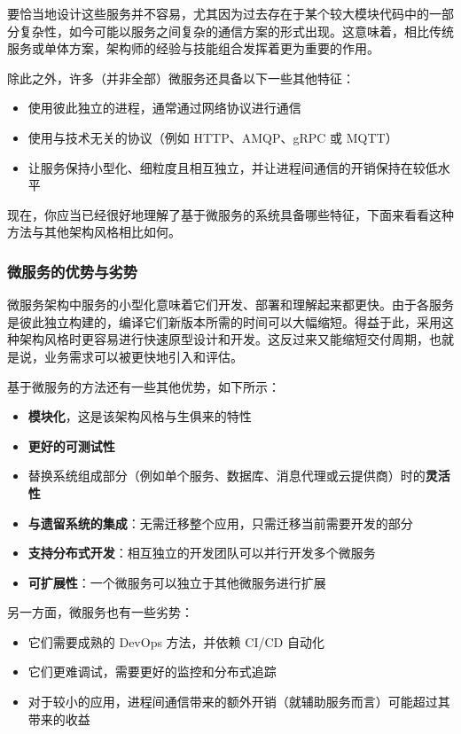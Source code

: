 要恰当地设计这些服务并不容易，尤其因为过去存在于某个较大模块代码中的一部分复杂性，如今可能以服务之间复杂的通信方案的形式出现。这意味着，相比传统服务或单体方案，架构师的经验与技能组合发挥着更为重要的作用。

\label{idx:104}
除此之外，许多（并非全部）微服务还具备以下一些其他特征：

\begin{itemize}
\item 使用彼此独立的进程，通常通过网络协议进行通信
\item 使用与技术无关的协议（例如 HTTP、AMQP、gRPC 或 MQTT）
\item 让服务保持小型化、细粒度且相互独立，并让进程间通信的开销保持在较低水平
\end{itemize}

现在，你应当已经很好地理解了基于微服务的系统具备哪些特征，下面来看看这种方法与其他架构风格相比如何。

\subsubsection{微服务的优势与劣势}

\label{idx:105}
微服务架构中服务的小型化意味着它们开发、部署和理解起来都更快。由于各服务是彼此独立构建的，编译它们新版本所需的时间可以大幅缩短。得益于此，采用这种架构风格时更容易进行快速原型设计和开发。这反过来又能缩短交付周期，也就是说，业务需求可以被更快地引入和评估。

基于微服务的方法还有一些其他优势，如下所示：

\begin{itemize}
\item \textbf{模块化}，这是该架构风格与生俱来的特性
\item \textbf{更好的可测试性}
\item 替换系统组成部分（例如单个服务、数据库、消息代理或云提供商）时的\textbf{灵活性}
\item \textbf{与遗留系统的集成}：无需迁移整个应用，只需迁移当前需要开发的部分
\item \textbf{支持分布式开发}：相互独立的开发团队可以并行开发多个微服务
\item \textbf{可扩展性}：一个微服务可以独立于其他微服务进行扩展
\end{itemize}

\label{idx:106}
另一方面，微服务也有一些劣势：

\begin{itemize}
\item 它们需要成熟的 DevOps 方法，并依赖 CI/CD 自动化
\item 它们更难调试，需要更好的监控和分布式追踪
\item 对于较小的应用，进程间通信带来的额外开销（就辅助服务而言）可能超过其带来的收益
\end{itemize}

